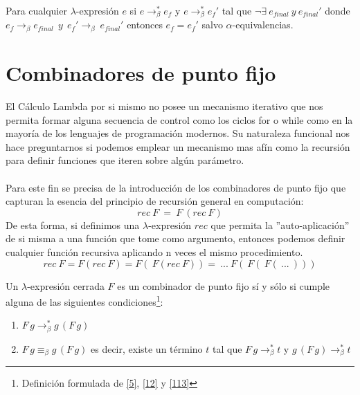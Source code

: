                     \begin{corollary}
Para cualquier $\lambda$-expresión $e$ si $e\to_\beta^*e_f$ y $e\to_\beta^*e_f'$ tal que  $\neg \exists\ e_{final}\ y\ e_{final}'$ donde $e_f \rightarrow_{\beta} e_{final}\ \ y\ \ e_f' \rightarrow_{\beta}\ e_{final}'$
entonces $e_f = e_f'$ salvo $\alpha$-equivalencias. 
                    \end{corollary}

        \section{Combinadores de punto fijo}
                    El Cálculo Lambda por si mismo no posee un mecanismo iterativo que nos permita formar alguna secuencia de control como los ciclos \textsf{for} o \textsf{while} como en la mayoría de los lenguajes de programación modernos. Su naturaleza funcional nos hace preguntarnos si podemos emplear un mecanismo mas afín como la recursión para definir funciones que iteren sobre algún parámetro.\\\\
                   Para este fin se precisa de la introducción de los combinadores de punto fijo que capturan la esencia del principio de recursión general en computación:
                    $$ rec\ F\ =\ F\ (rec\ F) $$
                    De esta forma, si definimos una $\lambda$-expresión $rec$ que permita la ''auto-aplicación'' de si misma a una función que tome como argumento, entonces podemos definir cualquier función recursiva aplicando n veces el mismo procedimiento.
                    $$rec\ F = F(rec\ F) = F(\ F(rec\ F)) =\ ...\ F(\ F(\ F(\ ...\ )))$$
                    
                    \begin{definition} Un $\lambda$-expresión cerrada $F$ es un combinador de punto fijo sí y sólo si cumple alguna de las siguientes condiciones\footnote{Definición formulada de \hyperlink{5}{[5]}, \hyperlink{12}{[12]} y \hyperlink{113}{[113]}}:
                        \begin{enumerate}
                            \item $F\,g\to_\beta^*g\,(F\,g)$
                            \item $F\,g\equiv_\beta g\,(F\,g)$ es decir, existe un término $t$ tal que $F\,g\to_\beta^*t$ y $g\,(F\,g)\to_\beta^*t$
                        \end{enumerate}
                    \end{definition}


